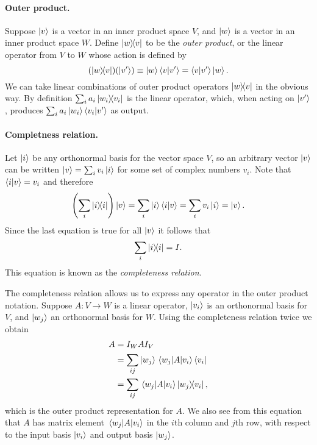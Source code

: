 \paragraph{Outer product.} Suppose $\ket{v}$ is a vector in an inner product
space $V$, and $\ket{w}$ is a vector in an inner product space $W$. Define
$\ketbra{w}{v}$ to be the \emph{outer product}, or the linear operator from $V$
to $W$ whose action is defined by \begin{equation}
  (\ketbra{w}{v})(\ket{v'}) \equiv \ket{w}\braket{v}{v'} = \braket{v}{v'}
    \ket{w}. \label{eq:out-prod}
\end{equation} We can take linear combinations of outer product operators
$\ketbra{w}{v}$ in the obvious way. By definition $\sum_i a_i
\ketbra{w_i}{v_i}$ is the linear operator, which, when acting on $\ket{v'}$,
produces $\sum_i a_i\ket{w_i} \braket{v_i}{v'}$ as output.

\paragraph{Completness relation.} Let $\ket{i}$ be any orthonormal basis for
the vector space $V$, so an arbitrary vector $\ket{v}$ can be written $\ket{v}
= \sum_i v_i\ket{i}$ for some set of complex numbers $v_i$. Note that
$\braket{i}{v} = v_i$ and therefore \begin{equation*}
  \left(\sum_i \ketbra{i}{i}\right)\ket{v} = \sum_i \ket{i}\braket{i}{v} =
    \sum_i v_i\ket{i} = \ket{v}.
\end{equation*} Since the last equation is true for all $\ket{v}$ it follows
that \begin{equation} \label{eq:comp-rel}
  \sum_i \ketbra{i}{i} = I.
\end{equation} This equation is known as the \emph{completeness relation}.

The completeness relation allows us to express any operator in the outer
product notation. Suppose $A : V \rightarrow W$ is a linear operator,
$\ket{v_i}$ is an orthonormal basis for $V$, and $\ket{w_j}$ an orthonormal
basis for $W$. Using the completeness relation twice we obtain \begin{align}
  A &= I_WAI_V \nonumber \\
    &= \sum_{ij} \ket{w_j}\mel{w_j}{A}{v_i}\bra{v_i} \nonumber \\
    &= \sum_{ij} \mel{w_j}{A}{v_i}\ketbra{w_j}{v_i}, \label{eq:out-prod-rep}
\end{align} which is the outer product representation for $A$. We also see from
this equation that $A$ has matrix element $\mel{w_j}{A}{v_i}$ in the $i$th
column and $j$th row, with respect to the input basis $\ket{v_i}$ and output
basis $\ket{w_j}$.

